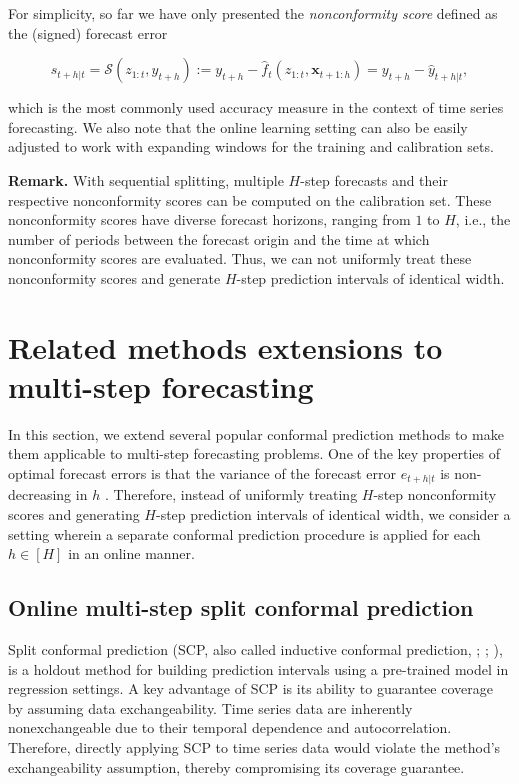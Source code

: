 \documentclass[
  11pt,
  a4paper,
]{article}
\theoremstyle{plain}
\theoremstyle{remark}
\begin{document}
For simplicity, so far we have only presented the \emph{nonconformity
score} defined as the (signed) forecast error

\[
s_{t+h|t}=\mathcal{S}\left(z_{1:t}, y_{t+h}\right):=y_{t+h}-\hat{f}_t\left(z_{1:t},\bm{x}_{t+1:h}\right)=y_{t+h}-\hat{y}_{t+h|t},
\]

which is the most commonly used accuracy measure in the context of time
series forecasting. We also note that the online learning setting can
also be easily adjusted to work with expanding windows for the training
and calibration sets.

\textbf{Remark.} With sequential splitting, multiple \(H\)-step
forecasts and their respective nonconformity scores can be computed on
the calibration set. These nonconformity scores have diverse forecast
horizons, ranging from \(1\) to \(H\), i.e., the number of periods
between the forecast origin and the time at which nonconformity scores
are evaluated. Thus, we can not uniformly treat these nonconformity
scores and generate \(H\)-step prediction intervals of identical width.

\section{Related methods extensions to multi-step
forecasting}\label{sec-ext}

In this section, we extend several popular conformal prediction methods
to make them applicable to multi-step forecasting problems. One of the
key properties of optimal forecast errors is that the variance of the
forecast error \(e_{t+h|t}\) is non-decreasing in \(h\)
\autocite{diebold1996,patton2007}. Therefore, instead of uniformly
treating \(H\)-step nonconformity scores and generating \(H\)-step
prediction intervals of identical width, we consider a setting wherein a
separate conformal prediction procedure is applied for each
\(h \in [H]\) in an online manner.

\subsection{Online multi-step split conformal
prediction}\label{online-multi-step-split-conformal-prediction}

Split conformal prediction (SCP, also called inductive conformal
prediction, \textcite{papadopoulos2002}; \textcite{vovk2005};
\textcite{lei2018}), is a holdout method for building prediction
intervals using a pre-trained model in regression settings. A key
advantage of SCP is its ability to guarantee coverage by assuming data
exchangeability. Time series data are inherently nonexchangeable due to
their temporal dependence and autocorrelation. Therefore, directly
applying SCP to time series data would violate the method's
exchangeability assumption, thereby compromising its coverage guarantee.
\end{document}

